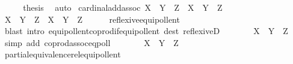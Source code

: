 \begin{isabellebody}
\ \ \isamarkupfalse%
\ \isamarkupfalse%
\ {\isacharquery}{\kern0pt}thesis\ \isamarkupfalse%
\ auto\isanewline
{}\isamarkupfalse%
%
\endisatagproof
{\isafoldproof}%
%
\isadelimproof
\isanewline
%
\endisadelimproof
\isanewline
{}\isamarkupfalse%
\ cardinal{\isacharunderscore}{\kern0pt}add{\isacharunderscore}{\kern0pt}assoc{\isacharcolon}{\kern0pt}\ {\isachardoublequoteopen}{\isacharparenleft}{\kern0pt}X\ {\isasymoplus}\ Y{\isacharparenright}{\kern0pt}\ {\isasymoplus}\ Z\ {\isacharequal}{\kern0pt}\ X\ {\isasymoplus}\ {\isacharparenleft}{\kern0pt}Y\ {\isasymoplus}\ Z{\isacharparenright}{\kern0pt}{\isachardoublequoteclose}\isanewline
%
\isadelimproof
%
\endisadelimproof
%
\isatagproof
{}\isamarkupfalse%
\ {\isacharminus}{\kern0pt}\isanewline
\ \ \isamarkupfalse%
\ {\isachardoublequoteopen}{\isacharbar}{\kern0pt}{\isacharparenleft}{\kern0pt}X\ {\isasymCoprod}\ Y{\isacharparenright}{\kern0pt}{\isacharbar}{\kern0pt}\ {\isasymCoprod}\ Z\ {\isasymapprox}\ {\isacharparenleft}{\kern0pt}X\ {\isasymCoprod}\ Y{\isacharparenright}{\kern0pt}\ {\isasymCoprod}\ Z{\isachardoublequoteclose}\isanewline
\ \ \ \ \isamarkupfalse%
\ reflexive{\isacharunderscore}{\kern0pt}equipollent\ \isamarkupfalse%
\ {\isacharparenleft}{\kern0pt}blast\ intro{\isacharcolon}{\kern0pt}\ equipollent{\isacharunderscore}{\kern0pt}coprod{\isacharunderscore}{\kern0pt}if{\isacharunderscore}{\kern0pt}equipollent\ dest{\isacharcolon}{\kern0pt}\ reflexiveD{\isacharparenright}{\kern0pt}\isanewline
\ \ \isamarkupfalse%
\ \isamarkupfalse%
\ {\isachardoublequoteopen}{\isachardot}{\kern0pt}{\isachardot}{\kern0pt}{\isachardot}{\kern0pt}\ {\isasymapprox}\ X\ {\isasymCoprod}\ {\isacharparenleft}{\kern0pt}Y\ {\isasymCoprod}\ Z{\isacharparenright}{\kern0pt}{\isachardoublequoteclose}\ \isamarkupfalse%
\ {\isacharparenleft}{\kern0pt}simp\ add{\isacharcolon}{\kern0pt}\ coprod{\isacharunderscore}{\kern0pt}assoc{\isacharunderscore}{\kern0pt}eqpoll{\isacharparenright}{\kern0pt}\isanewline
\ \ \isamarkupfalse%
\ \isamarkupfalse%
\ {\isachardoublequoteopen}{\isachardot}{\kern0pt}{\isachardot}{\kern0pt}{\isachardot}{\kern0pt}\ {\isasymapprox}\ X\ {\isasymCoprod}\ {\isacharbar}{\kern0pt}Y\ {\isasymCoprod}\ Z{\isacharbar}{\kern0pt}{\isachardoublequoteclose}\isanewline
\ \ \ \ \isamarkupfalse%
\ partial{\isacharunderscore}{\kern0pt}equivalence{\isacharunderscore}{\kern0pt}rel{\isacharunderscore}{\kern0pt}equipollent\isanewline

\end{isabellebody}
